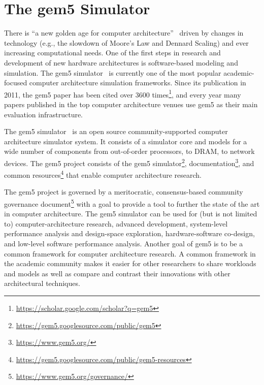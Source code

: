 \section{The gem5 Simulator}


There is ``a new golden age for computer architecture''~\cite{HennessyPatterson-turingLect-isca18, HennessyPatterson-CACM19} driven by changes in technology (e.g., the slowdown of Moore's Law and Dennard Scaling) and ever increasing computational needs.
One of the first steps in research and development of new hardware architectures is software-based modeling and simulation.
The gem5 simulator~\cite{Binkert-gem5-2011} is currently one of the most popular academic-focused computer architecture simulation frameworks.
Since its publication in 2011, the gem5 paper has been cited over 3600 times\footnote{\url{https://scholar.google.com/scholar?q=gem5}}, and every year many papers published in the top computer architecture venues use gem5 as their main evaluation infrastructure.

The gem5 simulator~\cite{Binkert-gem5-2011} is an open source community-supported computer architecture simulator system.
It consists of a simulator core and models for a wide number of components from out-of-order processors, to DRAM, to network devices.
The gem5 project consists of the gem5 simulator\footnote{\url{https://gem5.googlesource.com/public/gem5}}, documentation\footnote{\url{https://www.gem5.org/}}, and common resources\footnote{\url{https://gem5.googlesource.com/public/gem5-resources}} that enable computer architecture research.

The gem5 project is governed by a meritocratic, consensus-based community governance document\footnote{\url{https://www.gem5.org/governance/}} with a goal to provide a tool to further the state of the art in computer architecture.
The gem5 simulator can be used for (but is not limited to) computer-architecture research, advanced development, system-level performance analysis and design-space exploration, hardware-software co-design, and low-level software performance analysis.
Another goal of gem5 is to be a common framework for computer architecture research.
A common framework in the academic community makes it easier for other researchers to share workloads and models as well as compare and contrast their innovations with other architectural techniques.

